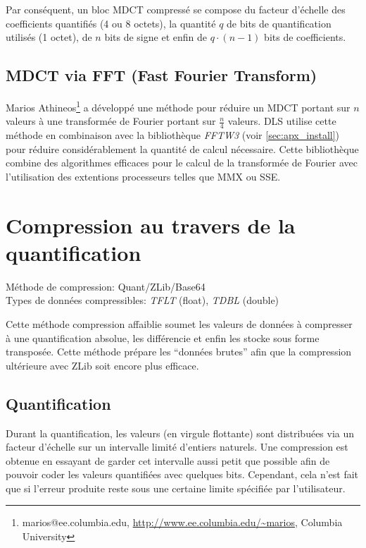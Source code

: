 \documentclass[a4paper,12pt,BCOR6mm,bibtotoc,idxtotoc]{scrbook}
\begin{document}
Par cons\'equent, un bloc MDCT compress\'e se compose
du facteur d'\'echelle des coefficients quantifi\'es (4 ou 8 octets),
la quantit\'e $q$ de bits de quantification utilis\'es (1 octet),
de $n$ bits de signe et enfin de $q \cdot (n - 1) $ bits de coefficients.

\subsection{MDCT via FFT (Fast Fourier Transform)}

Marios Athineos\footnote{marios@ee.columbia.edu,
  \url{http://www.ee.columbia.edu/~marios}, Columbia University} a
d\'evelopp\'e une m\'ethode pour r\'eduire un MDCT portant sur $n$
valeurs \`a une transform\'ee de Fourier portant sur $\frac{n}{4}$
valeurs.  DLS utilise cette m\'ethode en combinaison avec la
biblioth\`eque \textit{FFTW3} (voir \autoref{sec:apx_install})
pour r\'eduire consid\'erablement la quantit\'e de calcul n\'ecessaire.
Cette biblioth\`eque combine des algorithmes efficaces pour le calcul
de la transform\'ee de Fourier avec l'utilisation des extentions processeurs
telles que MMX ou SSE.


\section{Compression au travers de la quantification}
\label{sec:comp_quant} 

M\'ethode de compression: Quant/ZLib/Base64\\
Types de donn\'ees compressibles: \textit{TFLT} (float), \textit{TDBL} (double)

Cette m\'ethode compression affaiblie soumet les valeurs de donn\'ees
\`a compresser \`a une quantification absolue, les diff\'erencie et
enfin les stocke sous forme transpos\'ee.  Cette m\'ethode pr\'epare les
``donn\'ees brutes'' afin que la compression ult\'erieure avec ZLib
soit encore plus efficace.

\subsection{Quantification}

Durant la quantification, les valeurs (en virgule flottante) sont
distribu\'ees via un facteur d'\'echelle sur un intervalle limit\'e
d'entiers naturels.  Une compression est obtenue en essayant de garder
cet intervalle aussi petit que possible afin de pouvoir coder les
valeurs quantifi\'ees avec quelques bits. Cependant, cela n'est fait
que si l'erreur produite reste sous une certaine limite sp\'ecifi\'ee
par l'utilisateur.
\end{document}
